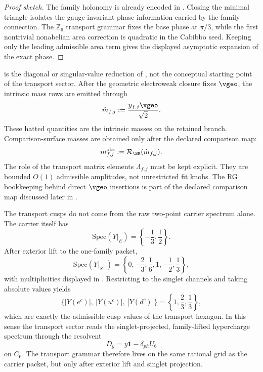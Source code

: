 \begin{proof}[Proof sketch]
The family holonomy is already encoded in . Closing the
minimal triangle isolates the gauge-invariant phase information carried by the family
connection. The $\mathbb Z_6$ transport grammar fixes the base phase at $\pi/3$, while the
first nontrivial nonabelian area correction is quadratic in the Cabibbo seed. Keeping only the
leading admissible area term gives the displayed asymptotic expansion of the exact phase.
\end{proof}

 is the diagonal or singular-value reduction of
, not the conceptual starting point of the transport sector.
After the geometric electroweak closure fixes $\vgeo$, the intrinsic mass rows are emitted through
\begin{equation}
\label{eq:mass-bridge}
\hat m_{f,j}:=\frac{y_{f,j}\vgeo}{\sqrt2}.
\end{equation}
These hatted quantities are the intrinsic masses on the retained branch. Comparison-surface masses
are obtained only after the declared comparison map:
\[
m_{f,j}^{\mathrm{obs}}:=\mathcal R_{\SM}(\hat m_{f,j}).
\]
The role of the transport matrix elements $\Lambda_{f,j}$ must be kept explicit. They are bounded $O(1)$ admissible amplitudes, not unrestricted fit knobs. The RG bookkeeping behind direct $\vgeo$ insertions is part of the declared comparison map discussed later in .

\begin{remark}
The transport cusps do not come from the raw two-point carrier spectrum alone. The carrier itself has
\[
\mathrm{Spec}(Y|_E)=\left\{-\frac13,\frac12\right\}.
\]
After exterior lift to the one-family packet,
\[
\mathrm{Spec}(Y|_{S^+})
=
\left\{0,-\frac23,\frac16,1,-\frac12,\frac13\right\},
\]
with multiplicities displayed in . Restricting to the singlet channels and taking absolute values yields
\[
\{|Y(e^c)|,\ |Y(u^c)|,\ |Y(d^c)|\}
=
\left\{1,\frac23,\frac13\right\},
\]
which are exactly the admissible cusp values of the transport hexagon. In this sense the transport sector reads the singlet-projected, family-lifted hypercharge spectrum through the resolvent
\[
D_y=y\mathbf 1-\delta_{ph}U_6
\]
on $C_6$. The transport grammar therefore lives on the same rational grid as the carrier packet, but only after exterior lift and singlet projection.
\end{remark}

